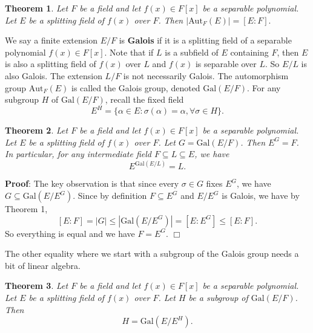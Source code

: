 \documentclass[12pt,letterpaper]{article}
\begin{document}
\noindent\textbf{Theorem 1}.
    \emph{Let $F$ be a field and let $f(x)\in F[x]$ be a separable polynomial. Let $E$ be a splitting field of $f(x)$ over $F$. Then $|\text{Aut}_F(E)| = [E:F].$}

We say a finite extension $E/F$ is \textbf{Galois} if it is a splitting field of a separable polynomial $f(x)\in F[x]$. Note that if $L$ is a subfield of $E$ containing $F$, then $E$ is also a splitting field of $f(x)$ over $L$ and $f(x)$ is separable over $L$. So $E/L$ is also Galois. The extension $L/F$ is not necessarily Galois. The automorphism group $\text{Aut}_F(E)$ is called the Galois group, denoted $\text{Gal}(E/F)$. For any subgroup $H$ of $\text{Gal}(E/F)$, recall the fixed field
$$E^H = \{\alpha\in E\colon \sigma(\alpha) = \alpha,\forall \sigma\in H\}.$$

\noindent\textbf{Theorem 2}.
    \emph{Let $F$ be a field and let $f(x)\in F[x]$ be a separable polynomial. Let $E$ be a splitting field of $f(x)$ over $F$. Let $G = \text{Gal}(E/F)$. Then $E^G = F$. In particular, for any intermediate field $F\subseteq L\subseteq E$, we have $$E^{\text{Gal}(E/L)} = L.$$}

\noindent\textbf{Proof}: The key observation is that since every $\sigma\in G$ fixes $E^G$, we have $G \subseteq \text{Gal}(E/E^G).$ Since by definition $F\subseteq E^G$ and $E/E^G$ is Galois, we have by Theorem 1,
$$[E:F] = |G| \leq |\text{Gal}(E/E^G)| = [E:E^G] \leq [E:F].$$
So everything is equal and we have $F = E^G$. $\Box$

The other equality where we start with a subgroup of the Galois group needs a bit of linear algebra.

\noindent\textbf{Theorem 3}.
    \emph{Let $F$ be a field and let $f(x)\in F[x]$ be a separable polynomial. Let $E$ be a splitting field of $f(x)$ over $F$. Let $H$ be a subgroup of $\text{Gal}(E/F)$. Then$$H = \text{Gal}(E/E^H).$$}
\end{document}
